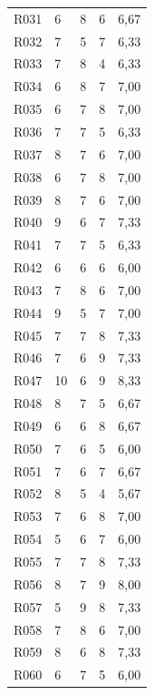 {\begin{longtable}{L{1.05cm}R{2.1cm}R{2.1cm}R{2.1cm}R{3.0cm}}
R031 & 6 & 8 & 6 & 6,67 \\
R032 & 7 & 5 & 7 & 6,33 \\
R033 & 7 & 8 & 4 & 6,33 \\
R034 & 6 & 8 & 7 & 7,00 \\
R035 & 6 & 7 & 8 & 7,00 \\
R036 & 7 & 7 & 5 & 6,33 \\
R037 & 8 & 7 & 6 & 7,00 \\
R038 & 6 & 7 & 8 & 7,00 \\
R039 & 8 & 7 & 6 & 7,00 \\
R040 & 9 & 6 & 7 & 7,33 \\
R041 & 7 & 7 & 5 & 6,33 \\
R042 & 6 & 6 & 6 & 6,00 \\
R043 & 7 & 8 & 6 & 7,00 \\
R044 & 9 & 5 & 7 & 7,00 \\
R045 & 7 & 7 & 8 & 7,33 \\
R046 & 7 & 6 & 9 & 7,33 \\
R047 & 10 & 6 & 9 & 8,33 \\
R048 & 8 & 7 & 5 & 6,67 \\
R049 & 6 & 6 & 8 & 6,67 \\
R050 & 7 & 6 & 5 & 6,00 \\
R051 & 7 & 6 & 7 & 6,67 \\
R052 & 8 & 5 & 4 & 5,67 \\
R053 & 7 & 6 & 8 & 7,00 \\
R054 & 5 & 6 & 7 & 6,00 \\
R055 & 7 & 7 & 8 & 7,33 \\
R056 & 8 & 7 & 9 & 8,00 \\
R057 & 5 & 9 & 8 & 7,33 \\
R058 & 7 & 8 & 6 & 7,00 \\
R059 & 8 & 6 & 8 & 7,33 \\
R060 & 6 & 7 & 5 & 6,00 \\
\end{longtable}
}

